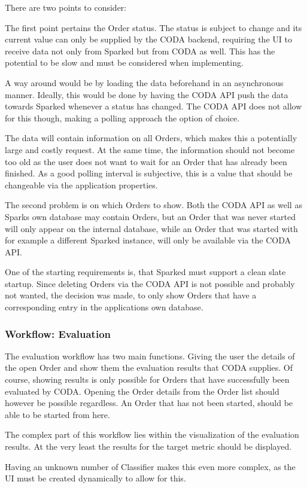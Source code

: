 There are two points to consider:

The first point pertains the Order status. The status is subject to change and its current value can only be supplied by the CODA backend, requiring the UI to receive data not only from Sparked but from CODA as well. This has the potential to be slow and must be considered when implementing. 

A way around would be by loading the data beforehand in an asynchronous manner. Ideally, this would be done by having the CODA API push the data towards Sparked whenever a status has changed. The CODA API does not allow for this though, making a polling approach the option of choice. 

The data will contain information on all Orders, which makes this a potentially large and costly request. At the same time, the information should not become too old as the user does not want to wait for an Order that has already been finished. As a good polling interval is subjective, this is a value that should be changeable via the application properties.

The second problem is on which Orders to show. Both the CODA API as well as Sparks own database may contain Orders, but an Order that was never started will only appear on the internal database, while an Order that was started with for example a different Sparked instance, will only be available via the CODA API. 

One of the starting requirements is, that Sparked must support a clean slate startup. Since deleting Orders via the CODA API is not possible and probably not wanted, the decision was made, to only show Orders that have a corresponding entry in the applications own database. 

\subsubsection{Workflow: Evaluation}
The evaluation workflow has two main functions. Giving the user the details of the open Order and show them the evaluation results that CODA supplies. Of course, showing results is only possible for Orders that have successfully been evaluated by CODA. Opening the Order details from the Order list should however be possible regardless. An Order that has not been started, should be able to be started from here.

The complex part of this workflow lies within the visualization of the evaluation results. At the very least the results for the target metric should be displayed. 

Having an unknown number of Classifier makes this even more complex, as the UI must be created dynamically to allow for this.

